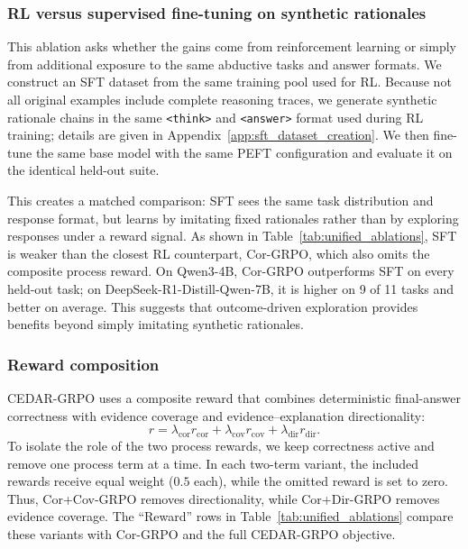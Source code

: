 \documentclass[11pt]{article}
\begin{document}
\subsubsection{RL versus supervised fine-tuning on synthetic rationales}
\label{sec:ablation_sft}

This ablation asks whether the gains come from reinforcement learning or simply from additional exposure to the same abductive tasks and answer formats. We construct an SFT dataset from the same training pool used for RL. Because not all original examples include complete reasoning traces, we generate synthetic rationale chains in the same \texttt{<think>} and \texttt{<answer>} format used during RL training; details are given in Appendix~\ref{app:sft_dataset_creation}. We then fine-tune the same base model with the same PEFT configuration and evaluate it on the identical held-out suite.

This creates a matched comparison: SFT sees the same task distribution and response format, but learns by imitating fixed rationales rather than by exploring responses under a reward signal. As shown in Table~\ref{tab:unified_ablations}, SFT is weaker than the closest RL counterpart, Cor-GRPO, which also omits the composite process reward. On Qwen3-4B, Cor-GRPO outperforms SFT on every held-out task; on DeepSeek-R1-Distill-Qwen-7B, it is higher on 9 of 11 tasks and better on average. This suggests that outcome-driven exploration provides benefits beyond simply imitating synthetic rationales.


\subsubsection{Reward composition}
\label{sec:ablation_rewards}

CEDAR-GRPO uses a composite reward that combines deterministic final-answer correctness with evidence coverage and evidence--explanation directionality:
\[
    r = \lambda_{\mathrm{cor}} r_{\mathrm{cor}}
      + \lambda_{\mathrm{cov}} r_{\mathrm{cov}}
      + \lambda_{\mathrm{dir}} r_{\mathrm{dir}} .
\]
To isolate the role of the two process rewards, we keep correctness active and remove one process term at a time. In each two-term variant, the included rewards receive equal weight ($0.5$ each), while the omitted reward is set to zero. Thus, Cor+Cov-GRPO removes directionality, while Cor+Dir-GRPO removes evidence coverage. The ``Reward'' rows in Table~\ref{tab:unified_ablations} compare these variants with Cor-GRPO and the full CEDAR-GRPO objective.
\end{document}
